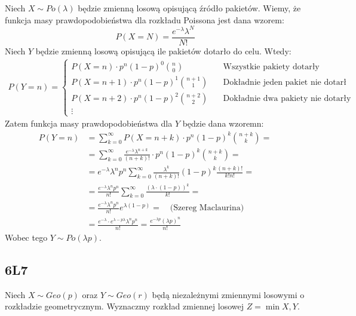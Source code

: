 \documentclass{article}
\begin{document}
Niech $X\sim Po(\lambda)$ będzie zmienną losową opisującą źródło pakietów. Wiemy, że funkcja masy prawdopodobieństwa dla rozkładu Poissona jest dana wzorem:
\[
    P(X=N) = \frac{e^{-\lambda}\lambda^{N}}{N!}
\]
Niech $Y$ będzie zmienną losową opisującą ile pakietów dotarło do celu. Wtedy:
\setcounter{equation}{0}
\begin{align}
    P(Y=n) = \begin{cases}
        P(X=n) \cdot p^n (1-p)^0 \binom{n}{0} \quad &\text{Wszystkie pakiety dotarły}\\
        P(X=n+1) \cdot p^n (1-p)^1 \binom{n+1}{1} \quad &\text{Dokładnie jeden pakiet nie dotarł}\\
        P(X=n+2) \cdot p^n (1-p)^2 \binom{n+2}{2} \quad &\text{Dokładnie dwa pakiety nie dotarły}\\
        \vdots
    \end{cases}
\end{align}
Zatem funkcja masy prawdopodobieństwa dla $Y$ będzie dana wzoremn:
\begin{align}
    P(Y=n) &= \sum_{k=0}^{\infty} P(X=n+k) \cdot p^n (1-p)^k \binom{n+k}{k} =\\
    &= \sum_{k=0}^{\infty} \frac{e^{-\lambda}\lambda^{n+k}}{(n+k)!} \cdot p^n (1-p)^k \binom{n+k}{k} =\\
    &= e^{-\lambda}\lambda^n p^n \sum_{k=0}^{\infty} \frac{\lambda^k}{(n+k)!} (1-p)^k \frac{(n+k)!}{k!n!} =\\
    &= \frac{e^{-\lambda} \lambda^n p^n}{n!} \sum_{k=0}^{\infty} \frac{(\lambda\cdot(1-p))^k}{k!} = \\
    &= \frac{e^{-\lambda} \lambda^n p^n}{n!} e^{\lambda(1-p)} = \quad \text{(Szereg Maclaurina)} \\
    &= \frac{e^{-\lambda} \cdot e^{\lambda-p\lambda} \lambda^{n} p^n}{n!} = \frac{e^{-\lambda p}(\lambda p)^n}{n!}
\end{align}
\noindent
Wobec tego $Y\sim Po(\lambda p)$.

\subsection{6L7}

Niech $X\sim Geo(p)$ oraz $Y\sim Geo(r)$ będą niezależnymi zmiennymi losowymi o rozkładzie geometrycznym. Wyznaczmy rozkład zmiennej losowej
$Z=\min{X,Y}$.
\end{document}

